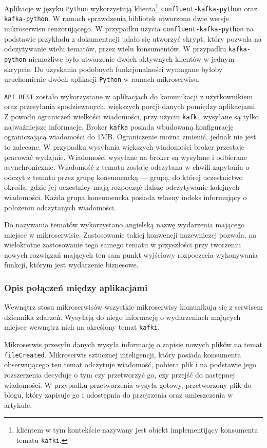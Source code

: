\documentclass[12pt,twoside]{article}
\begin{document}
Aplikacje w języku \texttt{Python} wykorzystują klienta\footnote{klientem w tym kontekście nazywany jest obiekt implementijący konsumenta tematu \texttt{kafki}.} \texttt{confluent-kafka-python}\cite{confluent} oraz \texttt{kafka-python}\cite{kafka-python}. W ramach sprawdzenia bibliotek utworzono dwie wersje mikroserwisu cenzorującego. W przypadku użycia \texttt{confluent-kafka-python} na podstawie przykładu z dokumentacji udało się utworzyć skrypt, który pozwala na odczytywanie wielu tematów, przez wielu konsumentów. W przypadku \texttt{kafka-python} niemożliwe było utworzenie dwóch aktywnych klientów w jednym skrypcie. Do uzyskania podobnych funkcjonalności wymagane byłoby uruchomienie dwóch aplikacji \texttt{Python} w ramach mikroserwisu.

\texttt{API REST} zostało wykorzystane w aplikacjach do komunikacji z użytkownikiem oraz przesyłania spodziewanych, większych porcji danych pomiędzy aplikacjami. Z powodu ograniczeń wielkości wiadomości, przy użyciu \texttt{kafki} wysyłane są tylko najważniejsze informacje. Broker \texttt{kafka} posiada wbudowaną konfigurację ograniczającą wiadomości do 1MB. Ograniczenie można zmienić, jednak nie jest to zalecane. W przypadku wysyłania większych wiadomości broker przestaje pracować wydajnie. Wiadomości wysyłane na broker są wysyłane i odbierane asynchronicznie. Wiadomość z tematu zostaje odczytana w chwili zapytania o odczyt z tematu przez grupę konsumencką — grupę, do której uczestnictwo określa, gdzie jej uczestnicy mają rozpocząć dalsze odczytywanie kolejnych wiadomości. Każda grupa konsumencka posiada własny indeks informujący o położeniu odczytanych wiadomości.

Do nazywania tematów wykorzystano angielską nazwę wydarzenia mającego miejsce w mikroserwisie. Zastosowanie takiej konwencji nazewniczej pozwala, na wielokrotne zastosowanie tego samego tematu w przyszłości przy tworzeniu nowych rozwiązań mających ten sam punkt wyjściowy rozpoczęcia wykonywania funkcji, którym jest wydarzenie biznesowe.

\subsubsection{Opis połączeń między aplikacjami}
Wewnątrz stosu mikroserwisów wszystkie mikroserwisy komunikują się z serwisem dziennika zdarzeń. Wysyłają do niego informację o wydarzeniach mających miejsce wewnątrz nich na określony temat \texttt{kafki}.

Mikroserwis przesyłu danych wysyła informację o zapisie nowych plików na temat \texttt{fileCreated}. Mikroserwis sztucznej inteligencji, który posiada konsumenta obserwującego ten temat odczytuje wiadomość, pobiera plik i na podstawie jego rozszerzenia decyduje o tym czy przetworzyć go, czy przejść do następnej wiadomości. W przypadku przetworzenia wysyła gotowy, przetworzony plik do blogu, który zapisuje go i udostępnia do przejrzenia oraz umieszczenia w artykule.
\end{document}
